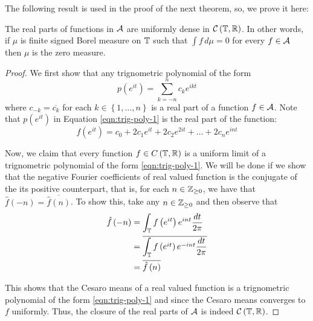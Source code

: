 The following result is used in the proof of the next theorem, so, we prove it here:

\begin{theorem}
    The real parts of functions in ${\cal A}$ are uniformly dense in ${\cal C} \left( \mathbb T , \mathbb R \right)$. In other words, if $\mu$ is finite signed Borel measure on $\mathbb T$ such that $\int f \, d\mu =0$ for every $f\in {\cal A}$ then $\mu$ is the zero measure.
    \label{thm:kinda-Fejer}
\end{theorem}
\begin{proof}
    We first show that any trignometric polynomial of the form
    \begin{equation}
	p\left( e^{it} \right) = \sum_{k=-n}^{n} c_{k} e^{ikt}
	\label{eqn:trig-poly-1}
    \end{equation}
    where $c_{-k} = \overline{c_{k}}$ for each $k\in \left\{ 1,\ldots , n \right\}$ is a real part of a function $f\in {\cal A}$. Note that $p\left( e^{it} \right)$ in Equation \ref{eqn:trig-poly-1} is the real part of the function:
    \begin{equation*}
	f\left( e^{it} \right) = c_{0} + 2c_{1} e^{it} + 2c_{2} e^{2it} + \ldots + 2 c_{n} e^{int}
    \end{equation*}

    
    Now, we claim that every function $f \in C\left( \mathbb T , \mathbb R \right)$ is a uniform limit of a trignometric polynomial of the form \ref{eqn:trig-poly-1}. We will be done if we show that the negative Fourier coefficients of real valued function is the conjugate of the its positive counterpart, that is, for each $n\in \mathbb Z_{\ge 0}$, we have that $\hat{f}\left( -n \right) = \overline{\hat{f} \left( n \right)}$. To show this, take any $n\in \mathbb Z _{\ge 0}$ and then observe that
    \begin{align*}
	\hat{f} \left( -n \right) &= \int_{\mathbb T} f\left( e^{it} \right) e^{int} \frac{dt}{2\pi} \\
	&= \overline{\int_{\mathbb T} f\left( e^{it} \right) e^{-int} \frac{dt}{2\pi}} \\
&= \overline{\hat{f} \left( n \right)}
    \end{align*}

This shows that the Cesaro means of a real valued function is a trignometric polynomial of the form \ref{eqn:trig-poly-1} and since the Cesaro means converges to $f$ uniformly. Thus, the closure of the real parts of ${\cal A}$ is indeed ${\cal C} \left( \mathbb T , \mathbb R \right)$.


\end{proof}

